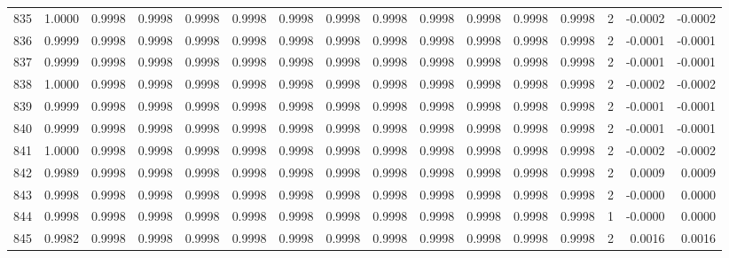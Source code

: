 \begin{tabular}{lrrrrrrrrrrrrrrr}
835 &      1.0000 &  0.9998 &  0.9998 &  0.9998 &  0.9998 &  0.9998 &  0.9998 &  0.9998 &  0.9998 &  0.9998 &   0.9998 &     0.9998 &      2 &                   -0.0002 &                    -0.0002 \\
836 &      0.9999 &  0.9998 &  0.9998 &  0.9998 &  0.9998 &  0.9998 &  0.9998 &  0.9998 &  0.9998 &  0.9998 &   0.9998 &     0.9998 &      2 &                   -0.0001 &                    -0.0001 \\
837 &      0.9999 &  0.9998 &  0.9998 &  0.9998 &  0.9998 &  0.9998 &  0.9998 &  0.9998 &  0.9998 &  0.9998 &   0.9998 &     0.9998 &      2 &                   -0.0001 &                    -0.0001 \\
838 &      1.0000 &  0.9998 &  0.9998 &  0.9998 &  0.9998 &  0.9998 &  0.9998 &  0.9998 &  0.9998 &  0.9998 &   0.9998 &     0.9998 &      2 &                   -0.0002 &                    -0.0002 \\
839 &      0.9999 &  0.9998 &  0.9998 &  0.9998 &  0.9998 &  0.9998 &  0.9998 &  0.9998 &  0.9998 &  0.9998 &   0.9998 &     0.9998 &      2 &                   -0.0001 &                    -0.0001 \\
840 &      0.9999 &  0.9998 &  0.9998 &  0.9998 &  0.9998 &  0.9998 &  0.9998 &  0.9998 &  0.9998 &  0.9998 &   0.9998 &     0.9998 &      2 &                   -0.0001 &                    -0.0001 \\
841 &      1.0000 &  0.9998 &  0.9998 &  0.9998 &  0.9998 &  0.9998 &  0.9998 &  0.9998 &  0.9998 &  0.9998 &   0.9998 &     0.9998 &      2 &                   -0.0002 &                    -0.0002 \\
842 &      0.9989 &  0.9998 &  0.9998 &  0.9998 &  0.9998 &  0.9998 &  0.9998 &  0.9998 &  0.9998 &  0.9998 &   0.9998 &     0.9998 &      2 &                    0.0009 &                     0.0009 \\
843 &      0.9998 &  0.9998 &  0.9998 &  0.9998 &  0.9998 &  0.9998 &  0.9998 &  0.9998 &  0.9998 &  0.9998 &   0.9998 &     0.9998 &      2 &                   -0.0000 &                     0.0000 \\
844 &      0.9998 &  0.9998 &  0.9998 &  0.9998 &  0.9998 &  0.9998 &  0.9998 &  0.9998 &  0.9998 &  0.9998 &   0.9998 &     0.9998 &      1 &                   -0.0000 &                     0.0000 \\
845 &      0.9982 &  0.9998 &  0.9998 &  0.9998 &  0.9998 &  0.9998 &  0.9998 &  0.9998 &  0.9998 &  0.9998 &   0.9998 &     0.9998 &      2 &                    0.0016 &                     0.0016 \\

\end{tabular}
